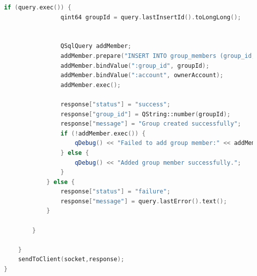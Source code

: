 \documentclass[UTF8]{ctexart}
\begin{document}
\begin{lstlisting}[language=C++, caption=服务端接受信息并处理]
			if (query.exec()) {
				qint64 groupId = query.lastInsertId().toLongLong();
				
				
				QSqlQuery addMember;
				addMember.prepare("INSERT INTO group_members (group_id, account, role) VALUES (:group_id, :account, 'owner')");
				addMember.bindValue(":group_id", groupId);
				addMember.bindValue(":account", ownerAccount);
				addMember.exec();
				
				response["status"] = "success";
				response["group_id"] = QString::number(groupId);
				response["message"] = "Group created successfully";
				if (!addMember.exec()) {
					qDebug() << "Failed to add group member:" << addMember.lastError().text();
				} else {
					qDebug() << "Added group member successfully.";
				}
			} else {
				response["status"] = "failure";
				response["message"] = query.lastError().text();
			}
			
		}
		
	}
	sendToClient(socket,response);
}
\end{lstlisting}
\end{document}
